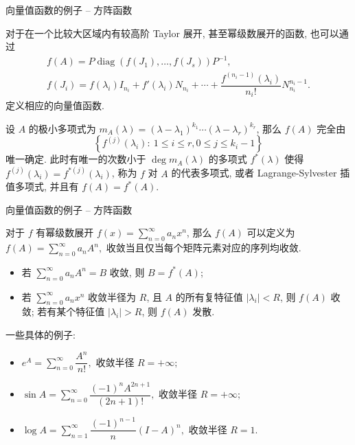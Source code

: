 \begin{frame}{向量值函数的例子 -- 方阵函数}

对于在一个比较大区域内有较高阶 Taylor 展开, 甚至幂级数展开的函数, 也可以通过
\begin{gather*}
f(A) = P\operatorname{diag}(f(J_1), \dots, f(J_s))P^{-1}, \\
f(J_i) = f(\lambda_i) I_{n_i} + f'(\lambda_i) N_{n_i} + \cdots + \dfrac{f^{(n_i-1)}(\lambda_i)}{n_i!} N_{n_i}^{n_i-1}.
\end{gather*}
定义相应的向量值函数.

\pause
\vspace{1em}

设 $A$ 的极小多项式为 $m_A(\lambda) = (\lambda-\lambda_1)^{k_1} \cdots (\lambda-\lambda_r)^{k_r}$, 那么 $f(A)$ 完全由
\[\left\{ f^{(j)}(\lambda_i): ~ 1 \leq i \leq r, 0 \leq j \leq k_i-1 \right\}\]
唯一确定. 此时有唯一的次数小于 $\deg m_A(\lambda)$ 的多项式 $f^*(\lambda)$ 使得 $f^{(j)}(\lambda_i) = f^{*(j)}(\lambda_i)$,
称为 $f$ 对 $A$ 的代表多项式, 或者 Lagrange-Sylvester 插值多项式, 并且有 $f(A) = f^*(A)$.

\end{frame}


\begin{frame}{向量值函数的例子 -- 方阵函数}

对于 $f$ 有幂级数展开 $f(x) = \sum\limits_{n=0}^{\infty} a_n x^n$, 那么 $f(A)$ 可以定义为 $f(A) = \sum\limits_{n=0}^{\infty} a_n A^n,$ 收敛当且仅当每个矩阵元素对应的序列均收敛.

\pause

\begin{itemize}
\item 若 $\sum\limits_{n=0}^{\infty} a_n A^n = B$ 收敛, 则 $B = f^*(A)$;
\pause
\item 若 $\sum\limits_{n=0}^{\infty} a_n x^n$ 收敛半径为 $R$, 且 $A$ 的所有复特征值 $\lvert \lambda_i \rvert < R$, 则 $f(A)$ 收敛; 若有某个特征值 $\lvert \lambda_i \rvert > R$, 则 $f(A)$ 发散.
\end{itemize}

\pause

一些具体的例子:
\begin{itemize}
\item $e^A = \sum\limits_{n=0}^{\infty} \dfrac{A^n}{n!},$ 收敛半径 $R = +\infty;$
\item $\sin A = \sum\limits_{n=0}^{\infty} \dfrac{(-1)^n A^{2n+1}}{(2n+1)!},$ 收敛半径 $R = +\infty;$
\item $\log A = \sum\limits_{n=1}^{\infty} \dfrac{(-1)^{n-1}}{n} (I-A)^n,$ 收敛半径 $R = 1.$
\end{itemize}

\end{frame}
\normalmode

